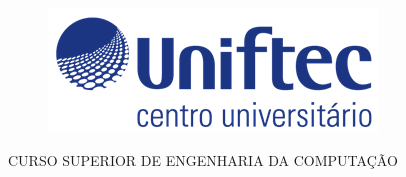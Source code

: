   \begin{capa}%
    \begin{figure}[h!]%
        \centering%
        \includegraphics[scale=0.7]{figs/logoftec1.png}%
      \end{figure}%
    \center
	\ABNTEXchapterfont\large{CURSO SUPERIOR DE ENGENHARIA DA COMPUTAÇÃO}

    \vfill
    \ABNTEXchapterfont\large\imprimirautor
    
    \vfill

	\ABNTEXchapterfont\bfseries\LARGE\imprimirtitulo
	\vfill
%
    \large\imprimirlocal
    \linebreak
    \large\imprimirdata

    \vspace*{1cm}
  \end{capa}
